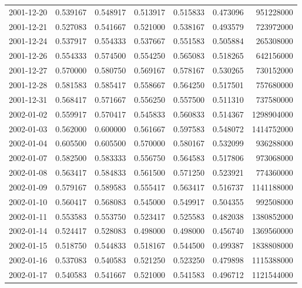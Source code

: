 \begin{tabular}{lrrrrrr}
2001-12-20 &    0.539167 &    0.548917 &    0.513917 &    0.515833 &    0.473096 &   951228000 \\
2001-12-21 &    0.527083 &    0.541667 &    0.521000 &    0.538167 &    0.493579 &   723972000 \\
2001-12-24 &    0.537917 &    0.554333 &    0.537667 &    0.551583 &    0.505884 &   265308000 \\
2001-12-26 &    0.554333 &    0.574500 &    0.554250 &    0.565083 &    0.518265 &   642156000 \\
2001-12-27 &    0.570000 &    0.580750 &    0.569167 &    0.578167 &    0.530265 &   730152000 \\
2001-12-28 &    0.581583 &    0.585417 &    0.558667 &    0.564250 &    0.517501 &   757680000 \\
2001-12-31 &    0.568417 &    0.571667 &    0.556250 &    0.557500 &    0.511310 &   737580000 \\
2002-01-02 &    0.559917 &    0.570417 &    0.545833 &    0.560833 &    0.514367 &  1298904000 \\
2002-01-03 &    0.562000 &    0.600000 &    0.561667 &    0.597583 &    0.548072 &  1414752000 \\
2002-01-04 &    0.605500 &    0.605500 &    0.570000 &    0.580167 &    0.532099 &   936288000 \\
2002-01-07 &    0.582500 &    0.583333 &    0.556750 &    0.564583 &    0.517806 &   973068000 \\
2002-01-08 &    0.563417 &    0.584833 &    0.561500 &    0.571250 &    0.523921 &   774360000 \\
2002-01-09 &    0.579167 &    0.589583 &    0.555417 &    0.563417 &    0.516737 &  1141188000 \\
2002-01-10 &    0.560417 &    0.568083 &    0.545000 &    0.549917 &    0.504355 &   992508000 \\
2002-01-11 &    0.553583 &    0.553750 &    0.523417 &    0.525583 &    0.482038 &  1380852000 \\
2002-01-14 &    0.524417 &    0.528083 &    0.498000 &    0.498000 &    0.456740 &  1369560000 \\
2002-01-15 &    0.518750 &    0.544833 &    0.518167 &    0.544500 &    0.499387 &  1838808000 \\
2002-01-16 &    0.537083 &    0.540583 &    0.521250 &    0.523250 &    0.479898 &  1115388000 \\
2002-01-17 &    0.540583 &    0.541667 &    0.521000 &    0.541583 &    0.496712 &  1121544000 \\

\end{tabular}
